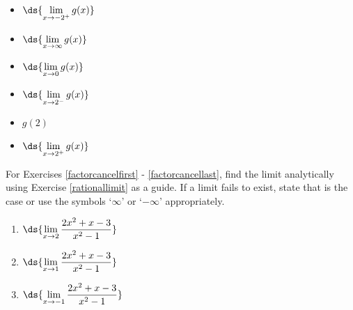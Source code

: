 \documentclass{ximera}
\begin{document}
\begin{enumerate}
\begin{multicols}{4}
\begin{itemize}
\item $\ds{\lim_{x \rightarrow -2^{+}} g(x)}$

\item  $\ds{\lim_{x \rightarrow \infty} g(x)}$

\end{itemize}

\end{multicols}

\bigskip

\begin{multicols}{4}

\begin{itemize}

\item $\ds{\lim_{x \rightarrow 0} g(x)}$

\item $\ds{\lim_{x \rightarrow 2^{-}} g(x)}$

\item  $g(2)$

\item $\ds{\lim_{x \rightarrow 2^{+}} g(x)}$
\end{itemize}

\end{multicols}

\bigskip

\setcounter{HW}{\value{enumi}}
\end{enumerate}

For Exercises \ref{factorcancelfirst} - \ref{factorcancellast}, find the limit analytically using Exercise \ref{rationallimit} as a guide.  If a limit fails to exist, state that is the case  or use the symbols `$\infty$' or `$-\infty$' appropriately.
 
\begin{multicols}{3}

\begin{enumerate}
\setcounter{enumi}{\value{HW}}

\item\label{factorcancelfirst}  $\ds{\lim_{x \rightarrow 2} \dfrac{2x^2+x-3}{x^2-1}}$
  
\item  $\ds{\lim_{x \rightarrow 1} \dfrac{2x^2+x-3}{x^2-1}}$

\item   $\ds{\lim_{x \rightarrow -1} \dfrac{2x^2+x-3}{x^2-1}}$

\setcounter{HW}{\value{enumi}}
\end{enumerate}

\end{multicols}
\end{document}
